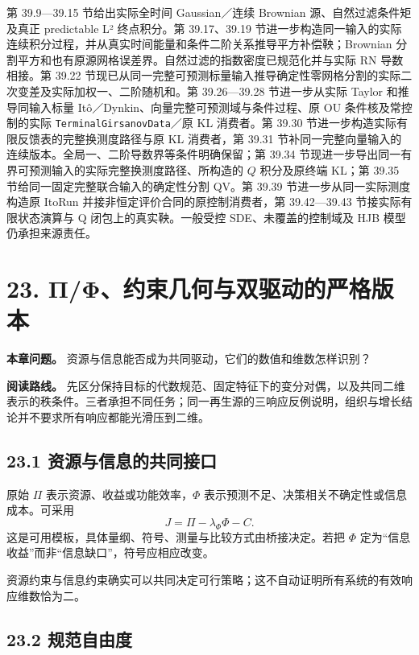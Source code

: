 \documentclass[
  11pt,
  oneside]{book}
\begin{document}
第 39.9---39.15 节给出实际全时间 Gaussian／连续 Brownian 源、自然过滤条件矩及真正 predictable L² 终点积分。第 39.17、39.19 节进一步构造同一输入的实际连续积分过程，并从真实时间能量和条件二阶关系推导平方补偿鞅；Brownian 分割平方和也有原源网格误差界。自然过滤的指数密度已规范化并与实际 RN 导数相接。第 39.22 节现已从同一完整可预测标量输入推导确定性零网格分割的实际二次变差及实际加权一、二阶随机和。第 39.26---39.28 节进一步从实际 Taylor 和推导同输入标量 Itô／Dynkin、向量完整可预测域与条件过程、原 OU 条件核及常控制的实际 \nolinkurl{TerminalGirsanovData}／原 KL 消费者。第 39.30 节进一步构造实际有限反馈表的完整换测度路径与原 KL 消费者，第 39.31 节补同一完整向量输入的连续版本。全局一、二阶导数界等条件明确保留；第 39.34 节现进一步导出同一有界可预测输入的实际完整换测度路径、所构造的 \(Q\) 积分及原终端 KL；第 39.35 节给同一固定完整联合输入的确定性分割 QV。第 39.39 节进一步从同一实际测度构造原 ItoRun 并接非恒定评价合同的原控制消费者，第 39.42---39.43 节接实际有限状态演算与 Q 闭包上的真实鞅。一般受控 SDE、未覆盖的控制域及 HJB 模型仍承担来源责任。

\chapter{23. Π/Φ、约束几何与双驱动的严格版本}\label{ch-23}

\textbf{本章问题。} 资源与信息能否成为共同驱动，它们的数值和维数怎样识别？

\textbf{阅读路线。} 先区分保持目标的代数规范、固定特征下的变分对偶，以及共同二维表示的秩条件。三者承担不同任务；同一再生源的三响应反例说明，组织与增长结论并不要求所有响应都能光滑压到二维。

\section{23.1 资源与信息的共同接口}\label{ux8d44ux6e90ux4e0eux4fe1ux606fux7684ux5171ux540cux63a5ux53e3}

原始 \(\Pi\) 表示资源、收益或功能效率，\(\Phi\) 表示预测不足、决策相关不确定性或信息成本。可采用 \[J=\Pi-\lambda_\Phi\Phi-C.\] 这是可用模板，具体量纲、符号、测量与比较方式由桥接决定。若把 \(\Phi\) 定为``信息收益''而非``信息缺口''，符号应相应改变。

资源约束与信息约束确实可以共同决定可行策略；这不自动证明所有系统的有效响应维数恰为二。

\section{23.2 规范自由度}\label{ux89c4ux8303ux81eaux7531ux5ea6}
\end{document}
